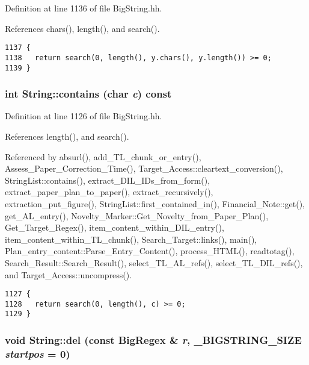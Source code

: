 Definition at line 1136 of file Big\-String.hh.

References chars(), length(), and search().



\footnotesize\begin{verbatim}1137 {   
1138   return search(0, length(), y.chars(), y.length()) >= 0;
1139 }
\end{verbatim}\normalsize 
{}
\subsubsection{\setlength{\rightskip}{0pt plus 5cm}int String::contains (char {\em c}) const\hspace{0.3cm}{\tt  [inline]}}\label{classString_a32}




Definition at line 1126 of file Big\-String.hh.

References length(), and search().

Referenced by absurl(), add\_\-TL\_\-chunk\_\-or\_\-entry(), Assess\_\-Paper\_\-Correction\_\-Time(), Target\_\-Access::cleartext\_\-conversion(), String\-List::contains(), extract\_\-DIL\_\-IDs\_\-from\_\-form(), extract\_\-paper\_\-plan\_\-to\_\-paper(), extract\_\-recursively(), extraction\_\-put\_\-figure(), String\-List::first\_\-contained\_\-in(), Financial\_\-Note::get(), get\_\-AL\_\-entry(), Novelty\_\-Marker::Get\_\-Novelty\_\-from\_\-Paper\_\-Plan(), Get\_\-Target\_\-Regex(), item\_\-content\_\-within\_\-DIL\_\-entry(), item\_\-content\_\-within\_\-TL\_\-chunk(), Search\_\-Target::links(), main(), Plan\_\-entry\_\-content::Parse\_\-Entry\_\-Content(), process\_\-HTML(), readtotag(), Search\_\-Result::Search\_\-Result(), select\_\-TL\_\-AL\_\-refs(), select\_\-TL\_\-DIL\_\-refs(), and Target\_\-Access::uncompress().



\footnotesize\begin{verbatim}1127 {
1128   return search(0, length(), c) >= 0;
1129 }
\end{verbatim}\normalsize 
{}
\subsubsection{\setlength{\rightskip}{0pt plus 5cm}void String::del (const {\bf Big\-Regex} \& {\em r}, {\bf \_\-BIGSTRING\_\-SIZE} {\em startpos} = 0)}\label{classString_a88}




